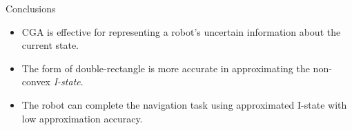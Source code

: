 \begin{frame}{Conclusions}
  \begin{itemize}
  \item CGA is effective for representing a robot's uncertain information about
    the current state.
  \item The form of double-rectangle is more accurate in approximating the non-convex
    \emph{I-state}.
  \item The robot can complete the navigation task using approximated I-state with
    low approximation accuracy.
  \end{itemize}
\end{frame}

